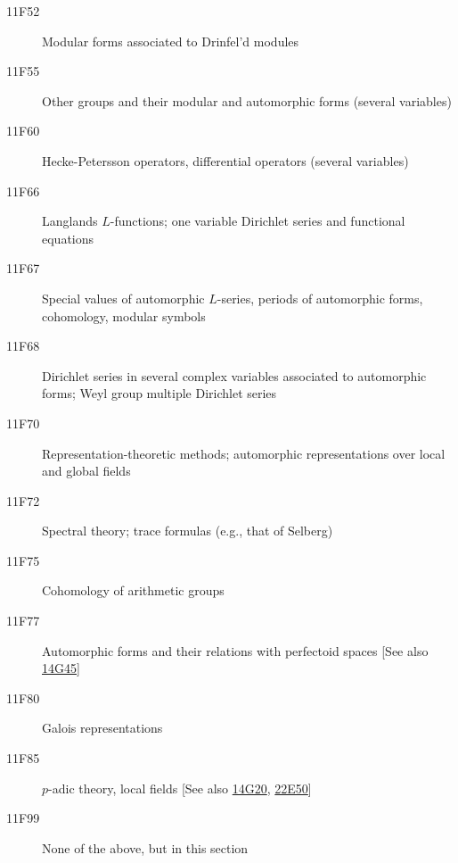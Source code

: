 \begin{description}
\item [11F52]\label{11F52} Modular forms associated to Drinfel'd modules
\item [11F55]\label{11F55} Other groups and their modular and automorphic forms (several variables)
\item [11F60]\label{11F60} Hecke-Petersson operators, differential operators (several variables)
\item [11F66]\label{11F66} Langlands $L$-functions; one variable Dirichlet series and functional equations
\item [11F67]\label{11F67} Special values of automorphic $L$-series, periods of automorphic forms, cohomology, modular symbols
\item [11F68]\label{11F68} Dirichlet series in several complex variables associated to automorphic forms; Weyl group multiple Dirichlet series
\item [11F70]\label{11F70} Representation-theoretic methods; automorphic representations over local and global fields
\item [11F72]\label{11F72} Spectral theory; trace formulas (e.g., that of Selberg)
\item [11F75]\label{11F75} Cohomology of arithmetic groups
\item [11F77]\label{11F77} Automorphic forms and their relations with perfectoid spaces [See also \hyperref[14G45]{14G45}]
\item [11F80]\label{11F80} Galois representations
\item [11F85]\label{11F85} $p$-adic theory, local fields [See also \hyperref[14G20]{14G20}, \hyperref[22E50]{22E50}]
\item [11F99]\label{11F99} None of the above, but in this section
\end{description}
